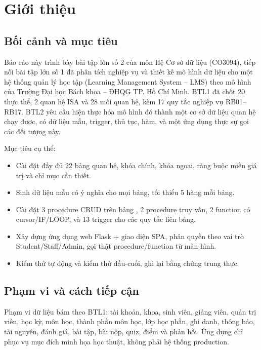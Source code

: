 \documentclass[a4paper,13pt]{extarticle}
\providecommand{\Tbl}[1]{\texttt{\detokenize{#1}}}
\begin{document}

\section{Giới thiệu}

\subsection{Bối cảnh và mục tiêu}

Báo cáo này trình bày bài tập lớn số 2 của môn Hệ Cơ sở dữ liệu (CO3094), tiếp nối
bài tập lớn số 1 đã phân tích nghiệp vụ và thiết kế mô hình dữ liệu cho một hệ thống
quản lý học tập (Learning Management System -- LMS) theo mô hình của Trường Đại học
Bách khoa -- ĐHQG TP. Hồ Chí Minh. BTL1 đã chốt 20 thực thể, 2 quan hệ ISA và 28
mối quan hệ, kèm 17 quy tắc nghiệp vụ RB01--RB17. BTL2 yêu cầu hiện thực hóa mô hình
đó thành một cơ sở dữ liệu quan hệ chạy được, có dữ liệu mẫu, trigger, thủ tục, hàm,
và một ứng dụng thực sự gọi các đối tượng này.

Mục tiêu cụ thể:

\begin{itemize}
    \item Cài đặt đầy đủ 22 bảng quan hệ, khóa chính, khóa ngoại, ràng buộc miền giá trị
          và chỉ mục cần thiết.
    \item Sinh dữ liệu mẫu có ý nghĩa cho mọi bảng, tối thiểu 5 hàng mỗi bảng.
    \item Cài đặt 3 procedure CRUD trên bảng \Tbl{Enrollment}, 2 procedure truy vấn,
          2 function có cursor/IF/LOOP, và 13 trigger cho các quy tắc liên bảng.
    \item Xây dựng ứng dụng web Flask + giao diện SPA, phân quyền theo vai trò
          Student/Staff/Admin, gọi thật procedure/function từ màn hình.
    \item Kiểm thử tự động và kiểm thử đầu-cuối, ghi lại bằng chứng trung thực.
\end{itemize}

\subsection{Phạm vi và cách tiếp cận}

Phạm vi dữ liệu bám theo BTL1: tài khoản, khoa, sinh viên, giảng viên, quản trị viên,
học kỳ, môn học, thành phần môn học, lớp học phần, ghi danh, thông báo, tài nguyên,
đánh giá, bài tập, bài nộp, quiz, điểm và phản hồi. Ứng dụng chỉ phục vụ mục đích
minh họa học thuật, không phải hệ thống production.
\end{document}
